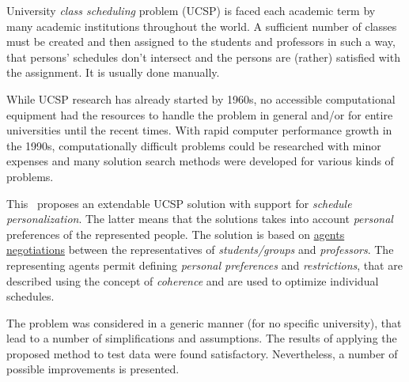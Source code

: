 University \emph{class scheduling} problem (UCSP) is faced each academic term
by many academic institutions throughout the world. A sufficient number of classes must
be created and then assigned to the students and professors in such a way,
that persons' schedules don't intersect and the persons are (rather) satisfied
with the assignment. It is usually done manually.

While UCSP research has already started by 1960s,
no accessible computational equipment had the resources to handle the problem
in general and/or for entire universities until the recent times.
With rapid computer performance growth in the 1990s, computationally
difficult problems could be researched with minor expenses and many
solution search methods were developed for various kinds of problems.
\medskip

\noindent
This \thisdoc\ proposes an extendable UCSP solution with support for
\emph{schedule personalization}. The latter means that the solutions takes
into account \emph{personal} preferences of the represented people.
The solution is based on \underline{agents negotiations} between the
representatives of \emph{students/groups} and \emph{professors}.
The representing agents permit defining \emph{personal preferences} and
\emph{restrictions}, that are described using the concept of \emph{coherence}
and are used to optimize individual schedules.


The problem was considered in a generic manner (for no specific university), that
lead to a number of simplifications and assumptions. The results of applying the
proposed method to test data were found satisfactory. Nevertheless, a number
of possible improvements is presented.
